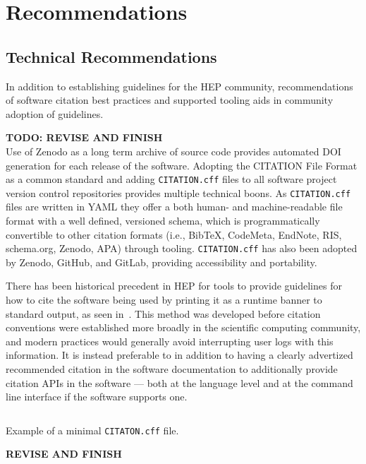 \section{Recommendations}\label{sec:recommendations}

\subsection{Technical Recommendations}\label{sec:recommendations_technical}

In addition to establishing guidelines for the HEP community, recommendations of software citation best practices and supported tooling aids in community adoption of guidelines.

\textbf{TODO: REVISE AND FINISH}\\
Use of Zenodo as a long term archive of source code provides automated DOI generation for each release of the software.
Adopting the CITATION File Format as a common standard and adding \texttt{CITATION.cff} files to all software project version control repositories provides multiple technical boons.
As \texttt{CITATION.cff} files are written in YAML they offer a both human- and machine-readable file format with a well defined, versioned schema, which is programmatically convertible to other citation formats (i.e., BibTeX, CodeMeta, EndNote, RIS, schema.org, Zenodo, APA) through tooling.
\texttt{CITATION.cff} has also been adopted by Zenodo, GitHub, and GitLab, providing accessibility and portability.

There has been historical precedent in HEP for tools to provide guidelines for how to cite the software being used by printing it as a runtime banner to standard output, as seen in~.
This method was developed before citation conventions were established more broadly in the scientific computing community, and modern practices would generally avoid interrupting user logs with this information.
It is instead preferable to in addition to having a clearly advertized recommended citation in the software documentation to additionally provide citation APIs in the software --- both at the language level and at the command line interface if the software supports one.

\label{lst:pythia_banner_2}

\begin{listing}
 \inputminted{yaml}{src/code/CITATION.cff}
 \caption{Example of a minimal \texttt{CITATON.cff} file.}
 \label{lst:cation.cff}
\end{listing}


\textbf{REVISE AND FINISH}
